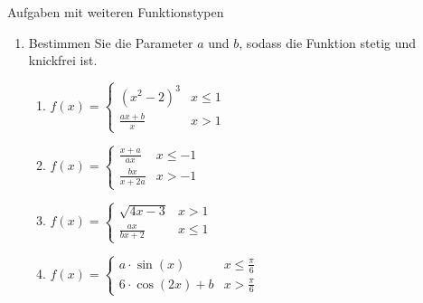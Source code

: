 \clearpage
\begin{ueb}
	{Aufgaben mit weiteren Funktionstypen}{}
	\begin{enumerate}
		\item Bestimmen Sie die Parameter $a$ und $b$, sodass die Funktion stetig und knickfrei ist.
		      \begin{enumerate}
			      \item $f(x) = \begin{cases}
					            (x^2-2)^3      & x \le 1 \\
					            \frac{ax+b}{x} & x > 1
				            \end{cases}$
			      \item $f(x) = \begin{cases}
					            \frac{x+a}{ax}  & x \le -1 \\
					            \frac{bx}{x+2a} & x > -1
				            \end{cases}$
			      \item $f(x) = \begin{cases}
					            \sqrt{4x-3}     & x > 1   \\
					            \frac{ax}{bx+2} & x \le 1
				            \end{cases}$
			      \item $f(x) = \begin{cases}
					            a\cdot \sin(x)      & x \le \frac{\pi}{6} \\
					            6\cdot \cos(2x) + b & x > \frac{\pi}{6}
				            \end{cases}$
		      \end{enumerate}


\end{enumerate}
\end{ueb}
